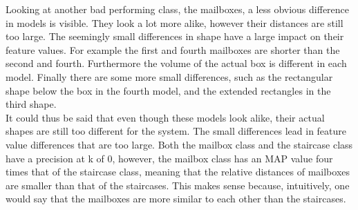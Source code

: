 \documentclass{bigdata}
\begin{document}
\noindent Looking at another bad performing class, the mailboxes, a less obvious difference in models is visible. They look a lot more alike, however their distances are still too large. The seemingly small differences in shape have a large impact on their feature values. For example the first and fourth mailboxes are shorter than the second and fourth. Furthermore the volume of the actual box is different in each model. Finally there are some more small differences, such as the rectangular shape below the box in the fourth model, and the extended rectangles in the third shape. \\
It could thus be said that even though these models look alike, their actual shapes are still too different for the system. The small differences lead in feature value differences that are too large. Both the mailbox class and the staircase class have a precision at k of 0, however, the mailbox class has an MAP value four times that of the staircase class, meaning that the relative distances of mailboxes are smaller than that of the staircases. This makes sense because, intuitively, one would say that the mailboxes are more similar to each other than the staircases. 
\end{document}
